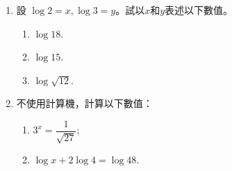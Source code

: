 \documentclass[11pt]{article}
\begin{document}
\begin{enumerate}
            \hrulefill
            
            \hrulefill
            
            \hrulefill
            
            \hrulefill
            
            \hrulefill
            
            \hrulefill
            
            \hrulefill
            
            \hrulefill
            
            \hrulefill
            
            \hrulefill
            
            \hrulefill

        \pagebreak
        \item 設 $\log{2}=x, \log{3}=y$。試以$x$和$y$表述以下數值。\begin{enumerate}
            \item $\log{18}$.
            \item $\log{15}$.
            \item $\log{\sqrt{12}}$.
        \end{enumerate}

        \hrulefill
            
            \hrulefill
            
            \hrulefill
            
            \hrulefill
            
            \hrulefill
            
            \hrulefill
            
            \hrulefill
            
            \hrulefill
            
            \hrulefill
            
            \hrulefill
            
            \hrulefill
            
            \hrulefill
            
            \hrulefill

        \item 不使用計算機，計算以下數值：\begin{enumerate}
            \item $3^x=\dfrac{1}{\sqrt{27}}$;
            \item $\log{x}+2\log{4}=\log{48}$.
        \end{enumerate}


\end{enumerate}
\end{document}
